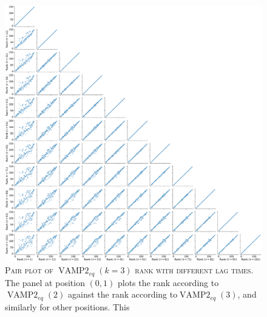 \documentclass{article}
\begin{document}
\begin{figure}
    \centering
    \includegraphics[width=1.0\textwidth]{figures/vampeq_rank_vs_lag_pairplot_k3.pdf}
    \caption{\textsc{Pair plot of $\operatorname{VAMP2}_{eq}(k=3)$ rank with different lag times.} The panel at position $(0,1)$ plots the rank according to$\operatorname{VAMP2}_{eq}(2)$ against the  rank according to$\operatorname{VAMP2}_{eq}(3)$, and similarly for other positions. This }
    \label{fig:vampeq3_rank_vs_lag_pairplot}
\end{figure}
\end{document}
